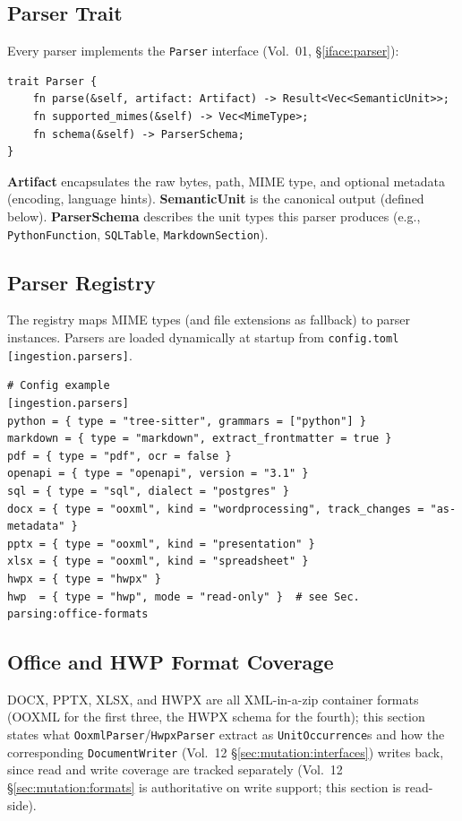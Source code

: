 \subsection{Parser Trait}
\label{sec:parsing:parser-trait}

Every parser implements the \texttt{Parser} interface (Vol.~01, \S\ref{iface:parser}):

\begin{verbatim}
trait Parser {
    fn parse(&self, artifact: Artifact) -> Result<Vec<SemanticUnit>>;
    fn supported_mimes(&self) -> Vec<MimeType>;
    fn schema(&self) -> ParserSchema;
}
\end{verbatim}

\textbf{Artifact} encapsulates the raw bytes, path, MIME type, and optional metadata (encoding, language hints).
\textbf{SemanticUnit} is the canonical output (defined below).
\textbf{ParserSchema} describes the unit types this parser produces (e.g., \texttt{PythonFunction}, \texttt{SQLTable}, \texttt{MarkdownSection}).

\subsection{Parser Registry}
\label{sec:parsing:registry}

The registry maps MIME types (and file extensions as fallback) to parser instances. Parsers are loaded dynamically at startup from \texttt{config.toml} \texttt{[ingestion.parsers]}.

\begin{verbatim}
# Config example
[ingestion.parsers]
python = { type = "tree-sitter", grammars = ["python"] }
markdown = { type = "markdown", extract_frontmatter = true }
pdf = { type = "pdf", ocr = false }
openapi = { type = "openapi", version = "3.1" }
sql = { type = "sql", dialect = "postgres" }
docx = { type = "ooxml", kind = "wordprocessing", track_changes = "as-metadata" }
pptx = { type = "ooxml", kind = "presentation" }
xlsx = { type = "ooxml", kind = "spreadsheet" }
hwpx = { type = "hwpx" }
hwp  = { type = "hwp", mode = "read-only" }  # see Sec. parsing:office-formats
\end{verbatim}

\subsection{Office and HWP Format Coverage}
\label{sec:parsing:office-formats}

DOCX, PPTX, XLSX, and HWPX are all XML-in-a-zip container formats (OOXML for the first three, the HWPX schema for the fourth); this section states what \texttt{OoxmlParser}/\texttt{HwpxParser} extract as \texttt{UnitOccurrence}s and how the corresponding \texttt{DocumentWriter} (Vol.~12 \S\ref{sec:mutation:interfaces}) writes back, since read and write coverage are tracked separately (Vol.~12 \S\ref{sec:mutation:formats} is authoritative on write support; this section is read-side).

